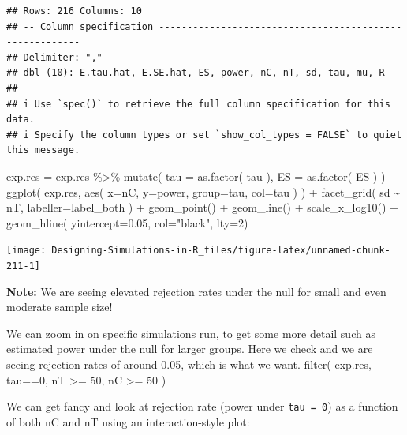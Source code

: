 \documentclass[
]{book}
\newenvironment{Shaded}{\begin{snugshade}}{\end{snugshade}}
\newcommand{\AttributeTok}[1]{\textcolor[rgb]{0.77,0.63,0.00}{#1}}
\newcommand{\DecValTok}[1]{\textcolor[rgb]{0.00,0.00,0.81}{#1}}
\newcommand{\FloatTok}[1]{\textcolor[rgb]{0.00,0.00,0.81}{#1}}
\newcommand{\FunctionTok}[1]{\textcolor[rgb]{0.00,0.00,0.00}{#1}}
\newcommand{\NormalTok}[1]{#1}
\newcommand{\OtherTok}[1]{\textcolor[rgb]{0.56,0.35,0.01}{#1}}
\newcommand{\SpecialCharTok}[1]{\textcolor[rgb]{0.00,0.00,0.00}{#1}}
\newcommand{\StringTok}[1]{\textcolor[rgb]{0.31,0.60,0.02}{#1}}
\begin{document}
\begin{verbatim}
## Rows: 216 Columns: 10
## -- Column specification --------------------------------------------------------
## Delimiter: ","
## dbl (10): E.tau.hat, E.SE.hat, ES, power, nC, nT, sd, tau, mu, R
## 
## i Use `spec()` to retrieve the full column specification for this data.
## i Specify the column types or set `show_col_types = FALSE` to quiet this message.
\end{verbatim}

\begin{Shaded}
\begin{Highlighting}[]
\NormalTok{exp.res }\OtherTok{=}\NormalTok{ exp.res }\SpecialCharTok{\%\textgreater{}\%} \FunctionTok{mutate}\NormalTok{( }\AttributeTok{tau =} \FunctionTok{as.factor}\NormalTok{( tau ),}
                              \AttributeTok{ES =} \FunctionTok{as.factor}\NormalTok{( ES ) )}
\FunctionTok{ggplot}\NormalTok{( exp.res, }\FunctionTok{aes}\NormalTok{( }\AttributeTok{x=}\NormalTok{nC, }\AttributeTok{y=}\NormalTok{power, }\AttributeTok{group=}\NormalTok{tau, }\AttributeTok{col=}\NormalTok{tau ) ) }\SpecialCharTok{+}
  \FunctionTok{facet\_grid}\NormalTok{( sd }\SpecialCharTok{\textasciitilde{}}\NormalTok{ nT, }\AttributeTok{labeller=}\NormalTok{label\_both ) }\SpecialCharTok{+}
  \FunctionTok{geom\_point}\NormalTok{() }\SpecialCharTok{+} \FunctionTok{geom\_line}\NormalTok{() }\SpecialCharTok{+}
  \FunctionTok{scale\_x\_log10}\NormalTok{() }\SpecialCharTok{+}
  \FunctionTok{geom\_hline}\NormalTok{( }\AttributeTok{yintercept=}\FloatTok{0.05}\NormalTok{, }\AttributeTok{col=}\StringTok{"black"}\NormalTok{, }\AttributeTok{lty=}\DecValTok{2}\NormalTok{)}
\end{Highlighting}
\end{Shaded}

\begin{center}\texttt{[image: Designing-Simulations-in-R\_files/figure-latex/unnamed-chunk-211-1]} \end{center}

\textbf{Note:} We are seeing elevated rejection rates under the null for small and even
moderate sample size!

We can zoom in on specific simulations run, to get some more detail
such as estimated power under the null for larger groups. Here we check
and we are seeing rejection rates of around 0.05, which is what we want.
filter( exp.res, tau==0, nT \textgreater= 50, nC \textgreater= 50 )

We can get fancy and look at rejection rate (power under \texttt{tau\ =\ 0}) as a
function of both nC and nT using an interaction-style plot:
\end{document}
